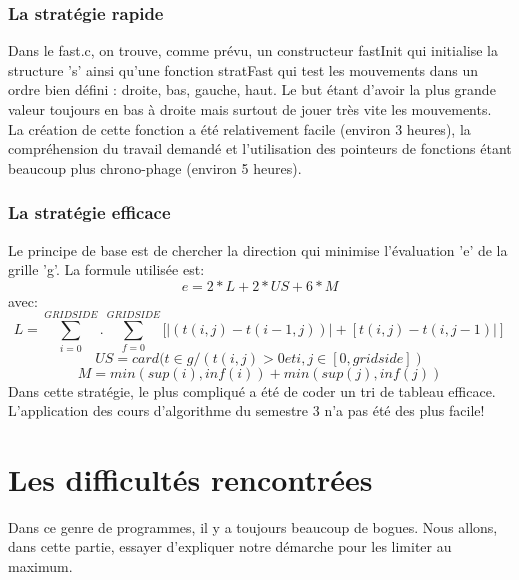 \documentclass{report}
\begin{document}
\subsection{La stratégie rapide}
Dans le fast.c, on trouve, comme prévu, un constructeur fastInit qui initialise la structure 's' ainsi qu'une fonction stratFast qui test les mouvements dans un ordre bien défini : droite, bas, gauche, haut. Le but étant d'avoir la plus grande valeur toujours en bas à droite mais surtout de jouer très vite les mouvements.\\
La création de cette fonction a été relativement facile (environ 3 heures), la compréhension du travail demandé et l'utilisation des pointeurs de fonctions étant beaucoup plus chrono-phage (environ 5 heures).
\subsection{La stratégie efficace}
Le principe de base est de chercher la direction qui minimise l'évaluation 'e' de la grille 'g'. La formule utilisée est:
$$e=2*L+2*US+6*M$$ avec:
$$L=\sum_{i=0}^{GRIDSIDE} .^{ } \sum_{f=0}^{GRIDSIDE}[|(t(i,j)-t(i-1,j))|+[t(i,j)-t(i,j-1)|]$$
$$US=card(t \in g / (t(i,j)>0 et i,j \in [0,gridside]) $$
$$M=min(sup(i),inf(i)) + min(sup(j),inf(j))$$
Dans cette stratégie, le plus compliqué a été de coder un tri de tableau efficace. L'application des cours d'algorithme du semestre 3 n'a pas été des plus facile!

\chapter{Les difficultés rencontrées}
Dans ce genre de programmes, il y a toujours beaucoup de bogues. Nous allons, dans cette partie, essayer d'expliquer notre démarche pour les limiter au maximum.
\end{document}
